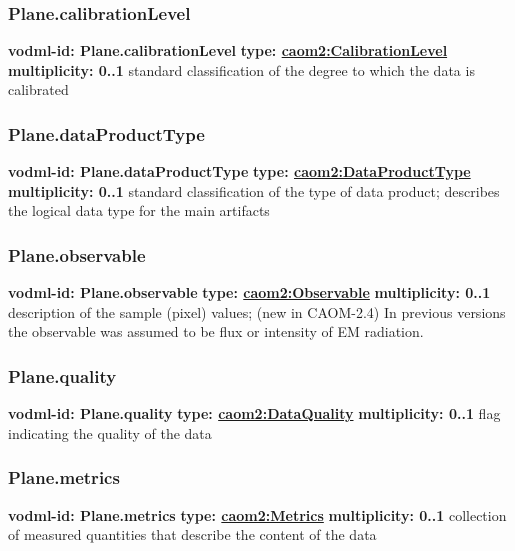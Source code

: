     \subsubsection{Plane.calibrationLevel}
      \textbf{vodml-id: Plane.calibrationLevel} \newline
      \textbf{type: \hyperref[sect:CalibrationLevel]{caom2:CalibrationLevel}} \newline
      \textbf{multiplicity: 0..1} \newline
      standard classification of the degree to which the data is calibrated

    \subsubsection{Plane.dataProductType}
      \textbf{vodml-id: Plane.dataProductType} \newline
      \textbf{type: \hyperref[sect:DataProductType]{caom2:DataProductType}} \newline
      \textbf{multiplicity: 0..1} \newline
      standard classification of the type of data product; describes the logical data type for the main artifacts

    \subsubsection{Plane.observable}
      \textbf{vodml-id: Plane.observable} \newline
      \textbf{type: \hyperref[sect:Observable]{caom2:Observable}} \newline
      \textbf{multiplicity: 0..1} \newline
      description of the sample (pixel) values; (new in CAOM-2.4) In previous versions the observable was assumed to be flux or intensity of EM radiation.

    \subsubsection{Plane.quality}
      \textbf{vodml-id: Plane.quality} \newline
      \textbf{type: \hyperref[sect:DataQuality]{caom2:DataQuality}} \newline
      \textbf{multiplicity: 0..1} \newline
      flag indicating the quality of the data

    \subsubsection{Plane.metrics}
      \textbf{vodml-id: Plane.metrics} \newline
      \textbf{type: \hyperref[sect:Metrics]{caom2:Metrics}} \newline
      \textbf{multiplicity: 0..1} \newline
      collection of measured quantities that describe the content of the data

